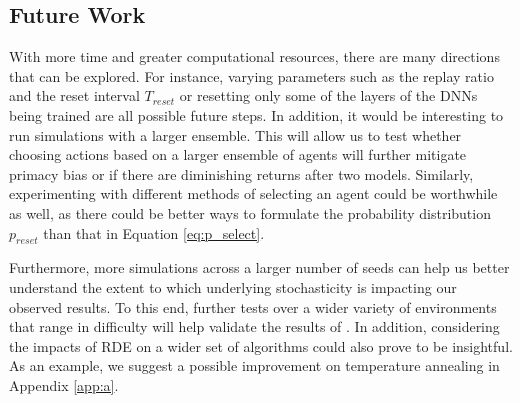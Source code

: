 \documentclass[base]{subfiles}
\begin{document}
\subsection{Future Work} 
\label{ssec:future}

With more time and greater computational resources, there are many directions that can be explored.
For instance, varying parameters such as the replay ratio and the reset interval $T_{reset}$ or resetting only some of the layers of the DNNs being trained are all possible future steps. 
In addition, it would be interesting to run simulations with a larger ensemble.
This will allow us to test whether choosing actions based on a larger ensemble of agents will further mitigate primacy bias or if there are diminishing returns after two models. 
Similarly, experimenting with different methods of selecting an agent could be worthwhile as well, as there could be better ways to formulate the probability distribution $p_{reset}$ than that in Equation \ref{eq:p_select}.

Furthermore, more simulations across a larger number of seeds can help us better understand the extent to which underlying stochasticity is impacting our observed results. 
To this end, further tests over a wider variety of environments that range in difficulty will help validate the results of \cite{kim2023}.
In addition, considering the impacts of RDE on a wider set of algorithms could also prove to be insightful.
As an example, we suggest a possible improvement on temperature annealing in Appendix \ref{app:a}.


\ifSubfilesClassLoaded{%
    \clearpage
	\printbibliography
}{}
\end{document}
